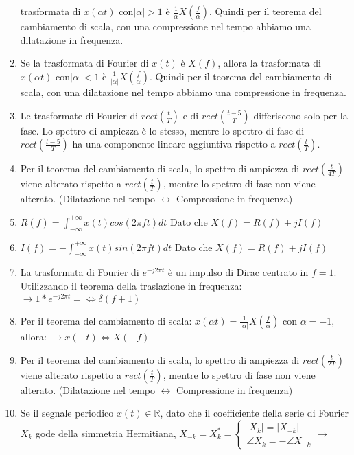 \documentclass[
  paper=a4,
  ,captions=tableheading
]{scrartcl}
\begin{document}
\begin{enumerate}
  trasformata di \(x(\alpha t)\) con\(|\alpha| > 1\) è
  \(\displaystyle \frac{1}{\alpha} X(\frac{f}{\alpha})\). Quindi per il
  teorema del cambiamento di scala, con una compressione nel tempo
  abbiamo una dilatazione in frequenza.
\item
  Se la trasformata di Fourier di \(x(t)\) è \(X(f)\), allora la
  trasformata di \(x(\alpha t)\) con\(|\alpha| < 1\) è
  \(\displaystyle \frac{1}{|\alpha|} X(\frac{f}{\alpha})\). Quindi per
  il teorema del cambiamento di scala, con una dilatazione nel tempo
  abbiamo una compressione in frequenza.
\item
  Le trasformate di Fourier di \(rect (\frac{t}{T})\) e di
  \(rect (\frac{t-5}{T})\) differiscono solo per la fase. Lo spettro di
  ampiezza è lo stesso, mentre lo spettro di fase di
  \(rect (\frac{t-5}{T})\) ha una componente lineare aggiuntiva rispetto
  a \(rect (\frac{t}{T})\).
\item
  Per il teorema del cambiamento di scala, lo spettro di ampiezza di
  \(rect(\frac{t}{4T})\) viene alterato rispetto a
  \(rect(\frac{t}{T})\), mentre lo spettro di fase non viene alterato.
  (Dilatazione nel tempo \(\leftrightarrow\) Compressione in frequenza)
\item
  \(\displaystyle R(f) = \int_{- \infty}^{+\infty} x(t) cos(2\pi ft)dt\)
  Dato che \(\displaystyle X(f) = R(f)+ jI(f)\)
\item
  \(\displaystyle I(f) =- \int_{- \infty}^{+\infty} x(t) sin(2\pi ft)dt\)
  Dato che \(\displaystyle X(f) = R(f)+ jI(f)\)
\item
  La trasformata di Fourier di \(e^{-j2\pi t}\) è un impulso di Dirac
  centrato in \(f = 1\). Utilizzando il teorema della traslazione in
  frequenza: \(\to 1*e^{-j2 \pi t} =\Leftrightarrow \delta (f+1)\)
\item
  Per il teorema del cambiamento di scala:
  \(\displaystyle x(\alpha t) = \frac{1}{|\alpha|} X(\frac{f}{\alpha})\)
  con \(\alpha = -1\), allora: \(\to x(-t) \Leftrightarrow X(-f)\)
\item
  Per il teorema del cambiamento di scala, lo spettro di ampiezza di
  \(rect(\frac{t}{2T})\) viene alterato rispetto a
  \(rect(\frac{t}{T})\), mentre lo spettro di fase non viene alterato.
  (Dilatazione nel tempo \(\leftrightarrow\) Compressione in frequenza)
\item
  Se il segnale periodico \(x(t) \in \mathbb{R}\), dato che il
  coefficiente della serie di Fourier \(X_k\) gode della simmetria
  Hermitiana,
  \(X_{-k} =X_k^* = \begin{cases} |X_k| =|X_{-k}| \\ \angle X_k = - \angle X_{-k} \end{cases} \to\)

\end{enumerate}
\end{document}
